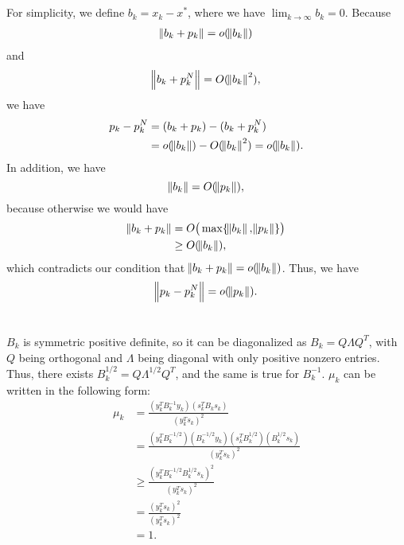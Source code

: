 \documentclass[11pt]{article}
\begin{document}
\maketitle
\section{}
For simplicity, we define $b_k = x_k - x^*$, where we have $\lim_{k\to\infty}b_k=0$. Because
\begin{equation}\begin{split}
\norm{b_k+p_k} = o(\norm{b_k})
\end{split}\nonumber\end{equation} 
and 
\begin{equation}\begin{split}
\norm{b_k+p_k^N} = O(\norm{b_k}^2),
\end{split}\nonumber\end{equation}
we have 
\begin{equation}\begin{split}
p_k-p_k^N &= (b_k+p_k) - (b_k+p_k^N) \\
&= o(\norm{b_k}) - O(\norm{b_k}^2) = o(\norm{b_k}).
\end{split}\nonumber\end{equation} 
In addition, we have
$$\norm{b_k} = O(\norm{p_k}),$$
because otherwise we would have 
\begin{equation}\begin{split} 
\norm{b_k+p_k} &= O\big(\max\{\norm{b_k},\norm{p_k}\}\big) \\
&\geq O(\norm{b_k}), 
\end{split}\nonumber\end{equation} 
which contradicts our condition that $\norm{b_k+p_k} = o(\norm{b_k})$. Thus, we have
\begin{equation}\begin{split}
\norm{p_k-p_k^N} = o(\norm{p_k}).
\end{split}\nonumber\end{equation} 
\section{}
$B_k$ is symmetric positive definite, so it can be diagonalized as $B_k = Q\Lambda Q^T$, with $Q$ being orthogonal and $\Lambda$ being diagonal with only positive nonzero entries. Thus, there exists $B_k^{1/2} = Q\Lambda^{1/2}Q^T$, and the same is true for $B_k^{-1}$. $\mu_k$ can be written in the following form:
\begin{equation}\begin{split} 
\mu_k &= \frac{(y_k^TB_k^{-1}y_k)(s_k^TB_ks_k)}{(y_k^Ts_k)^2} \\
&= \frac{(y_k^TB_k^{-1/2})(B_k^{-1/2}y_k)(s_k^TB_k^{1/2})(B_k^{1/2}s_k)}{(y_k^Ts_k)^2}\\
&\geq\frac{(y_k^TB_k^{-1/2}B_k^{1/2}s_k)^2}{(y_k^Ts_k)^2} \\
&=\frac{(y_k^Ts_k)^2}{(y_k^Ts_k)^2}\\
&=1.
\end{split}\nonumber\end{equation} 
\end{document}
